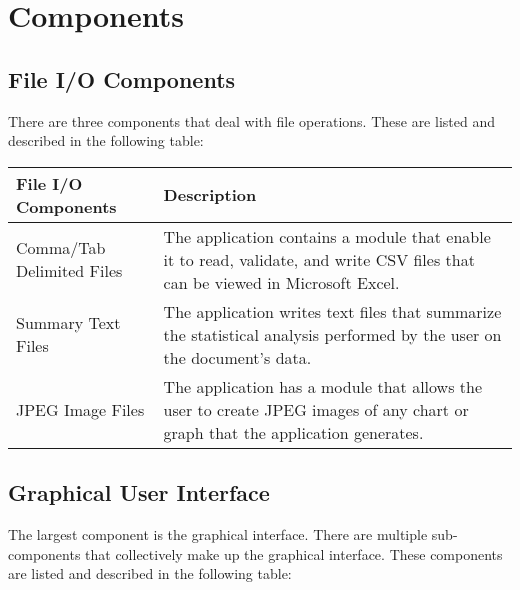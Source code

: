 \documentclass[12pt]{article}
\begin{document}
\section{Components}
\subsection{File I/O Components}
There are three components that deal with file operations. These are listed and
described in the following table:

\begin{center}
\begin{tabularx}{\textwidth}{|X|p{8cm}|}
	\hline \textbf{File I/O Components} & \textbf{Description} \\
	\hline Comma/Tab Delimited Files & The application contains a module that
		enable it to read, validate, and write CSV files that can be viewed in
		Microsoft Excel. \\
	\hline Summary Text Files & The application writes text files that
		summarize the statistical analysis performed by the user on the
		document’s data. \\
	\hline JPEG Image Files & The application has a module that allows the user
		to create JPEG images of any chart or graph that the application
		generates. \\
	\hline
\end{tabularx}
\end{center}

\subsection{Graphical User Interface}
The largest component is the graphical interface. There are multiple
sub-components that collectively make up the graphical interface. These
components are listed and described in the following table:
\end{document}
